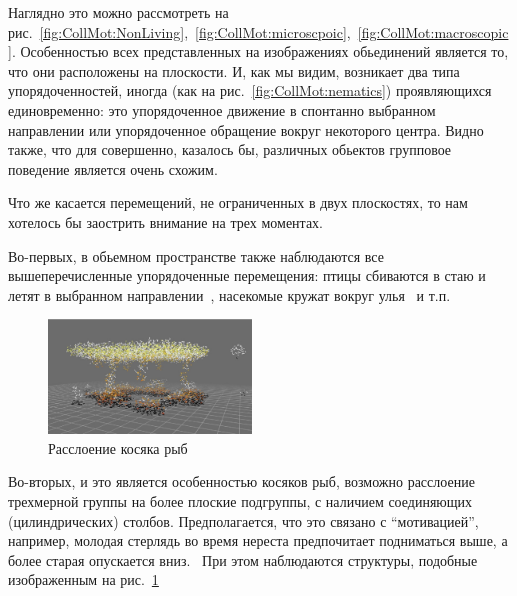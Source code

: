 	Наглядно это можно рассмотреть на рис.~\ref{fig:CollMot:NonLiving},~\ref{fig:CollMot:microscpoic},~\ref{fig:CollMot:macroscopic}. Особенностью всех представленных на изображениях обьединений является то, что они расположены на плоскости. И, как мы видим, возникает два типа упорядоченностей, иногда (как на рис.~\ref{fig:CollMot:nematics}) проявляющихся единовременно: это упорядоченное движение в спонтанно выбранном направлении или упорядоченное обращение вокруг некоторого центра. Видно также, что для совершенно, казалось бы, различных обьектов групповое поведение является очень схожим.

	Что же касается перемещений, не ограниченных в двух плоскостях, то нам хотелось бы заострить внимание на трех моментах. 

	Во-первых, в обьемном пространстве также наблюдаются все вышеперечисленные упорядоченные перемещения: птицы сбиваются в стаю и летят в выбранном направлении~\cite{dellariccia2008}, насекомые кружат вокруг улья~\cite{buhl2006} и т.п.

	\begin{figure}
	  \vspace{-20pt}
	  \begin{center}
	    \includegraphics[width=0.48\textwidth]{Images/Fig57_CollectiveMotion}
	  \end{center}
	  \vspace{-20pt}
	  \caption{Расслоение косяка рыб}
	  \label{fig:FishSplitting}
	  \vspace{-10pt}
	\end{figure}

	Во-вторых, и это является особенностью косяков рыб, возможно расслоение трехмерной группы на более плоские подгруппы, с наличием соединяющих (цилиндрических) столбов. Предполагается, что это связано с ``мотивацией'', например, молодая стерлядь во время нереста предпочитает подниматься выше, а более старая опускается вниз.~\cite{axelsen2000} При этом наблюдаются структуры, подобные изображенным на рис.~\ref{fig:FishSplitting}
